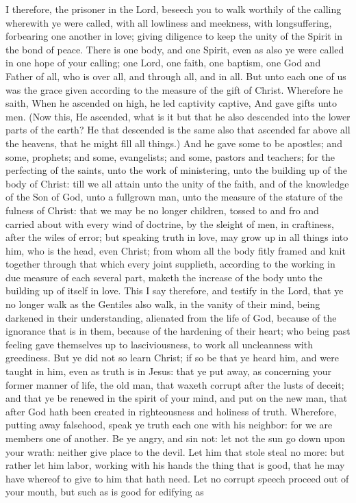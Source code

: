 I therefore, the prisoner in the Lord, beseech you to walk worthily of the calling wherewith ye were called, with all lowliness and meekness, with longsuffering, forbearing one another in love; giving diligence to keep the unity of the Spirit in the bond of peace. There is one body, and one Spirit, even as also ye were called in one hope of your calling; one Lord, one faith, one baptism, one God and Father of all, who is over all, and through all, and in all. But unto each one of us was the grace given according to the measure of the gift of Christ. Wherefore he saith, When he ascended on high, he led captivity captive, And gave gifts unto men.  (Now this, He ascended, what is it but that he also descended into the lower parts of the earth? He that descended is the same also that ascended far above all the heavens, that he might fill all things.) And he gave some to be apostles; and some, prophets; and some, evangelists; and some, pastors and teachers; for the perfecting of the saints, unto the work of ministering, unto the building up of the body of Christ: till we all attain unto the unity of the faith, and of the knowledge of the Son of God, unto a fullgrown man, unto the measure of the stature of the fulness of Christ: that we may be no longer children, tossed to and fro and carried about with every wind of doctrine, by the sleight of men, in craftiness, after the wiles of error; but speaking truth in love, may grow up in all things into him, who is the head, even Christ; from whom all the body fitly framed and knit together through that which every joint supplieth, according to the working in due measure of each several part, maketh the increase of the body unto the building up of itself in love.  This I say therefore, and testify in the Lord, that ye no longer walk as the Gentiles also walk, in the vanity of their mind, being darkened in their understanding, alienated from the life of God, because of the ignorance that is in them, because of the hardening of their heart; who being past feeling gave themselves up to lasciviousness, to work all uncleanness with greediness. But ye did not so learn Christ; if so be that ye heard him, and were taught in him, even as truth is in Jesus: that ye put away, as concerning your former manner of life, the old man, that waxeth corrupt after the lusts of deceit; and that ye be renewed in the spirit of your mind, and put on the new man, that after God hath been created in righteousness and holiness of truth.  Wherefore, putting away falsehood, speak ye truth each one with his neighbor: for we are members one of another. Be ye angry, and sin not: let not the sun go down upon your wrath: neither give place to the devil. Let him that stole steal no more: but rather let him labor, working with his hands the thing that is good, that he may have whereof to give to him that hath need. Let no corrupt speech proceed out of your mouth, but such as is good for edifying as 